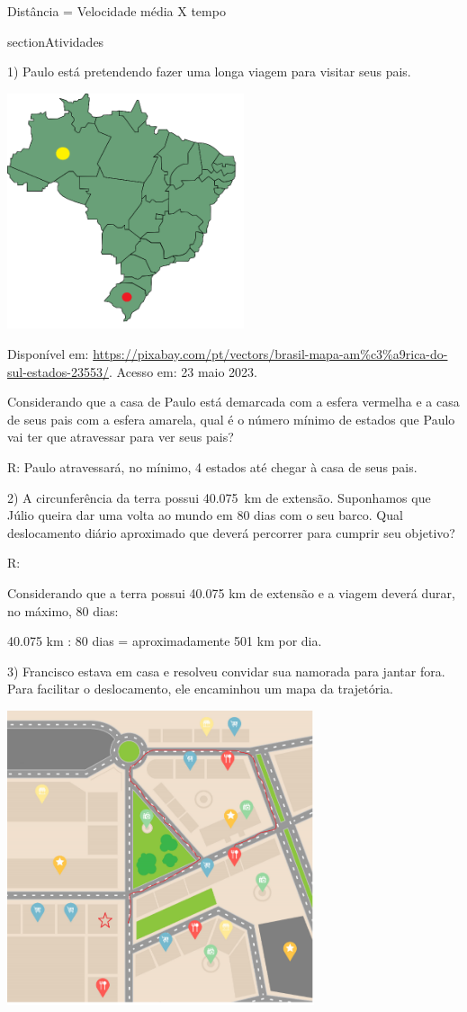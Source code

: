Distância = Velocidade média X tempo

section{Atividades}

1) Paulo está pretendendo fazer uma longa viagem para visitar seus pais.

\includegraphics[width=2.73952in,height=2.725in]{./imgSAEB_8_MAT/media/image36.png}

Disponível em:
\url{https://pixabay.com/pt/vectors/brasil-mapa-am\%c3\%a9rica-do-sul-estados-23553/}.
Acesso em: 23 maio 2023.

Considerando que a casa de Paulo está demarcada com a esfera vermelha e
a casa de seus pais com a esfera amarela, qual é o número mínimo de
estados que Paulo vai ter que atravessar para ver seus pais?

R: Paulo atravessará, no mínimo, 4 estados até chegar à casa de seus
pais.

2) A circunferência da terra possui 40.075~km de extensão. Suponhamos
que Júlio queira dar uma volta ao mundo em 80 dias com o seu barco. Qual
deslocamento diário aproximado que deverá percorrer para cumprir seu
objetivo?

R:

Considerando que a terra possui 40.075 km de extensão e a viagem deverá
durar, no máximo, 80 dias:

40.075 km : 80 dias = aproximadamente 501 km por dia.

3) Francisco estava em casa e resolveu convidar sua namorada para jantar
fora. Para facilitar o deslocamento, ele encaminhou um mapa da
trajetória.

\includegraphics[width=3.55in,height=3.406in]{./imgSAEB_8_MAT/media/image37.png}

